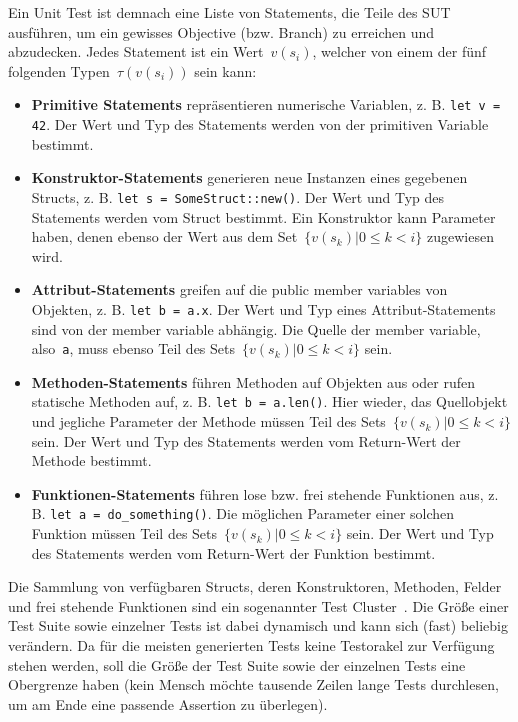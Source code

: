 \documentclass{article}
\begin{document}
Ein Unit Test ist demnach eine Liste von Statements, die Teile des \ac{SUT} ausführen, um ein gewisses Objective (bzw. Branch) zu erreichen und abzudecken. Jedes Statement ist ein Wert~$v(s_i)$, welcher von einem der fünf folgenden Typen~$\tau(v(s_i))$ sein kann:
\begin{itemize} 
	\item \textbf{Primitive Statements} repräsentieren numerische Variablen, z. B. \lstinline{let v = 42}. Der Wert und Typ des Statements werden von der primitiven Variable bestimmt. 
	\item \textbf{Konstruktor-Statements} generieren neue Instanzen eines gegebenen Structs, z. B. \lstinline{let s = SomeStruct::new()}. Der Wert und Typ des Statements werden vom Struct bestimmt. Ein Konstruktor kann Parameter haben, denen ebenso der Wert aus dem Set~$\{v(s_k) | 0 \leq k < i\}$ zugewiesen wird.
	\item \textbf{Attribut-Statements} greifen auf die public member variables von Objekten, z. B. \lstinline{let b = a.x}. Der Wert und Typ eines Attribut-Statements sind von der member variable abhängig. Die Quelle der member variable, also~\lstinline{a}, muss ebenso Teil des Sets~$\{v(s_k) | 0 \leq k < i\}$ sein. 
	\item \textbf{Methoden-Statements} führen Methoden auf Objekten aus oder rufen statische Methoden auf, z. B. \lstinline{let b = a.len()}. Hier wieder, das Quellobjekt und jegliche Parameter der Methode müssen Teil des Sets~$\{v(s_k) | 0 \leq k < i\}$ sein. Der Wert und Typ des Statements werden vom Return-Wert der Methode bestimmt. 
	\item \textbf{Funktionen-Statements} führen lose bzw. frei stehende Funktionen aus, z. B. \lstinline{let a = do_something()}. Die möglichen Parameter einer solchen Funktion müssen Teil des Sets~$\{v(s_k) | 0 \leq k < i\}$ sein. Der Wert und Typ des Statements werden vom Return-Wert der Funktion bestimmt. 
\end{itemize}

Die Sammlung von verfügbaren Structs, deren Konstruktoren, Methoden, Felder und frei stehende Funktionen sind ein sogenannter Test Cluster~\cite{Fraser_2011}. Die Größe einer Test Suite sowie einzelner Tests ist dabei dynamisch und kann sich (fast) beliebig verändern. Da für die meisten generierten Tests keine Testorakel zur Verfügung stehen werden, soll die Größe der Test Suite sowie der einzelnen Tests eine Obergrenze haben (kein Mensch möchte tausende Zeilen lange Tests durchlesen, um am Ende eine passende Assertion zu überlegen).
\end{document}
